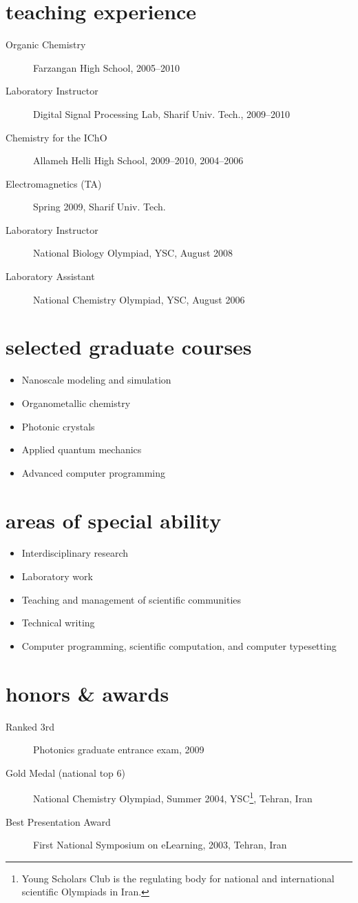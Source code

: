 \documentclass[overlapped,line,10pt,letterpaper]{res}
\begin{document}
\begin{resume}
\section{teaching experience}
\begin{description}
\item[Organic Chemistry] Farzangan High School, 2005–2010
\item[Laboratory Instructor] Digital Signal Processing Lab, Sharif Univ. Tech., 2009–2010
\item[Chemistry for the IChO] Allameh Helli High School, 2009–2010, 2004–2006
\item[Electromagnetics (TA)] Spring 2009, Sharif Univ. Tech.
\item[Laboratory Instructor] National Biology Olympiad, YSC, August 2008
\item[Laboratory Assistant] National Chemistry Olympiad, YSC, August 2006
\end{description}

\section{selected graduate courses}
\begin{itemize}
\item Nanoscale modeling and simulation
\item Organometallic chemistry
\item Photonic crystals
\item Applied quantum mechanics
\item Advanced computer programming
\end{itemize}

\section{areas of special ability}
\begin{itemize}
\item Interdisciplinary research
\item Laboratory work
\item Teaching and management of scientific communities
\item Technical writing
\item Computer programming, scientific computation, and computer typesetting
\end{itemize}

\section{honors \& awards}
\begin{description}
\item[Ranked 3rd] Photonics graduate entrance exam, 2009 
\item[Gold Medal (national top 6)] National Chemistry Olympiad, Summer 2004, YSC\footnote{Young Scholars Club is the regulating body for national and international scientific Olympiads in Iran.}, Tehran, Iran
\item[Best Presentation Award] First National Symposium on eLearning, 2003,
Tehran, Iran
\end{description}


\end{resume}
\end{document}
